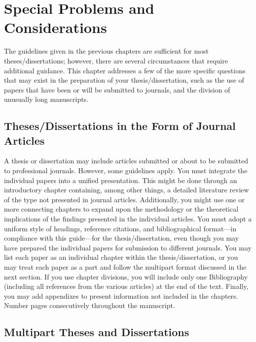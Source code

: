\chapter{Special Problems and Considerations}
\label{chap:SpecialProblemsAndConsiderations}

The guidelines given in the previous chapters are sufficient for most
the\-ses/dis\-ser\-ta\-tions; however, there are several circumstances
that require additional guidance. This chapter addresses a few of the
more specific questions that may exist in the preparation of your
the\-sis/dis\-ser\-ta\-tion, such as the use of papers that have been
or will be submitted to journals, and the division of unusually long
manuscripts.

\section{Theses/Dissertations in the Form of Journal Articles}
\label{sec:ThesesDissertationsInTheFormOfJournalArticles}

A thesis or dissertation may include articles submitted or about to be
submitted to professional journals. However, some guidelines apply.
You must integrate the individual papers into a unified presentation.
This might be done through an introductory chapter containing, among
other things, a detailed literature review of the type not presented
in journal articles. Additionally, you might use one or more
connecting chapters to expand upon the methodology or the theoretical
implications of the findings presented in the individual articles. You
must adopt a uniform style of headings, reference citations, and
bibliographical format---in compliance with this guide---for the
the\-sis/dis\-ser\-ta\-tion, even though you may have prepared the
individual papers for submission to different journals. You may list
each paper as an individual chapter within the
the\-sis/dis\-ser\-ta\-tion, or you may treat each paper as a part and
follow the multipart format discussed in the next section. If you use
chapter divisions, you will include only one Bibliography (including
all references from the various articles) at the end of the text.
Finally, you may add appendixes to present information not included in
the chapters. Number pages consecutively throughout the manuscript.

\section{Multipart Theses and Dissertations}
\label{sec:MultipartThesesAndDissertations}

